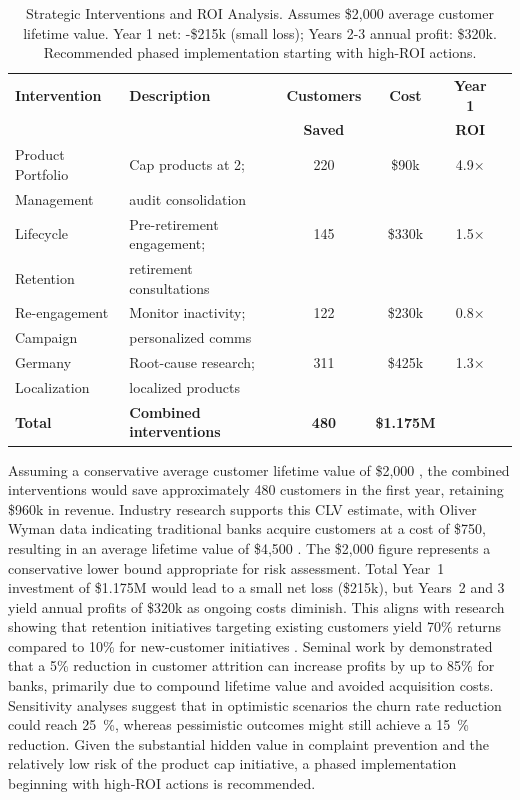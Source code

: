 \documentclass[12pt]{article}
\begin{document}
\begin{table}[H]
\centering
\caption{Strategic Interventions and ROI Analysis. Assumes \$2,000 average customer lifetime value. Year 1 net: -\$215k (small loss); Years 2-3 annual profit: \$320k. Recommended phased implementation starting with high-ROI actions.}
\label{tab:roi_analysis}
\begin{tabular}{lp{4cm}cccc}
\toprule
\textbf{Intervention} & \textbf{Description} & \textbf{Customers} & \textbf{Cost} & \textbf{Year 1} \\
& & \textbf{Saved} & & \textbf{ROI} \\
\midrule
Product Portfolio & Cap products at 2; & 220 & \$90k & 4.9× \\
Management & audit consolidation & & & \\
\midrule
Lifecycle & Pre-retirement engagement; & 145 & \$330k & 1.5× \\
Retention & retirement consultations & & & \\
\midrule
Re-engagement & Monitor inactivity; & 122 & \$230k & 0.8× \\
Campaign & personalized comms & & & \\
\midrule
Germany & Root-cause research; & 311 & \$425k & 1.3× \\
Localization & localized products & & & \\
\midrule
\textbf{Total} & \textbf{Combined interventions} & \textbf{480} & \textbf{\$1.175M} & \\
\bottomrule
\end{tabular}
\end{table}

Assuming a conservative average customer lifetime value of \$2,000 \citep{meleis2010clv}, the combined interventions would save approximately 480 customers in the first year, retaining \$960k in revenue.  Industry research supports this CLV estimate, with Oliver Wyman data indicating traditional banks acquire customers at a cost of \$750, resulting in an average lifetime value of \$4,500 \citep{chowdhry2019chime}.  The \$2,000 figure represents a conservative lower bound appropriate for risk assessment.  Total Year~1 investment of \$1.175M would lead to a small net loss (\$215k), but Years~2 and 3 yield annual profits of \$320k as ongoing costs diminish.  This aligns with research showing that retention initiatives targeting existing customers yield 70\% returns compared to 10\% for new‑customer initiatives \citep{browning2024retention}.  Seminal work by \citet{reichheld1990zero} demonstrated that a 5\% reduction in customer attrition can increase profits by up to 85\% for banks, primarily due to compound lifetime value and avoided acquisition costs.  Sensitivity analyses suggest that in optimistic scenarios the churn rate reduction could reach 25~\%, whereas pessimistic outcomes might still achieve a 15~\% reduction.  Given the substantial hidden value in complaint prevention and the relatively low risk of the product cap initiative, a phased implementation beginning with high‑ROI actions is recommended.
\end{document}
